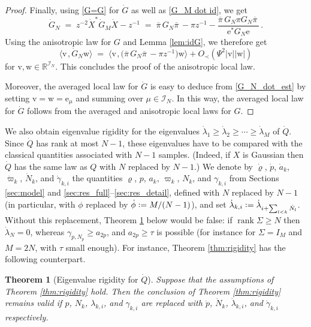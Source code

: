 \documentclass[11pt]{article} %
\newcommand{\nc}{\normalcolor}
\numberwithin{equation}{section}
\numberwithin{figure}{section}
\theoremstyle{plain} %
\newtheorem{theorem}{Theorem}[section]
\theoremstyle{definition} %
\newcommand{\f}[1]{\boldsymbol{\mathrm{#1}}} %
\renewcommand{\cal}{\mathcal}
\newcommand{\ol}[1]{\overline{#1} \!\,} %
\newcommand{\R}{\mathbb{R}}
\newcommand*{\deq}{\mathrel{\vcenter{\baselineskip0.65ex \lineskiplimit0pt \hbox{.}\hbox{.}}}=}
\renewcommand{\geq}{\geqslant}
\newcommand{\pb}[1]{\bigl({#1}\bigr)}
\newcommand{\abs}[1]{\lvert #1 \rvert}
\newcommand{\scalar}[2]{\langle{#1} \mspace{2mu}, {#2}\rangle}
\begin{document}
\begin{proof}
Finally, using \eqref{G=G} for $\dot G$ as well as \eqref{G_M dot id}, we get
\begin{equation*}
\dot G_N \;=\; z^{-2} \dot X^* \dot G_M \dot X - z^{-1} \;=\; \ol \pi G_N \ol \pi - \pi z^{-1} -  \frac{\ol \pi G_N \pi G_N \ol \pi}{\f e^* G_N \f e}\,.
\end{equation*}
 Using the anisotropic law for $G$ and Lemma \ref{lem:idG}, we therefore get \nc
\begin{equation} \label{G_N_dot_est}
\scalar{\f v}{\dot G_N \f w} \;=\; \scalar{\f v}{\pb{\ol \pi G_N \ol \pi - \pi z^{-1}} \f w}  + O_\prec(\Psi^2 \abs{\f v}\abs{\f w})
\end{equation}
for $\f v , \f w \in \R^{\cal I_N}$. This concludes the proof of the anisotropic local law.

Moreover, the averaged local law for $\dot G$ is easy to deduce from \eqref{G_N_dot_est} by setting $\f v = \f w = \f e_\mu$ and summing over $\mu \in \cal I_N$. In this way, the averaged local law for $\dot G$ follows from the averaged and anisotropic local laws for $G$.
\end{proof}

We also obtain eigenvalue rigidity for the eigenvalues $\dot \lambda_1 \geq \dot \lambda_2 \geq \cdots \geq \dot \lambda_M$ of $\dot Q$. Since $\dot Q$ has rank at most $N - 1$, these eigenvalues have to be compared with the classical quantities associated with $N - 1$ samples. (Indeed, if $X$ is Gaussian then $\dot Q$ has the same law as $Q$ with $N$ replaced by $N - 1$.) We denote by $\dot \varrho$, $\dot p$, $\dot a_k$, $\dot \varpi_k$, $\dot N_k$, and $\dot \gamma_{k,i}$ the quantities $\varrho$, $p$, $a_k$, $\varpi_k$, $N_k$, and $\gamma_{k,i}$ from Sections \ref{sec:model} and \ref{sec:res_full}--\ref{sec:res_detail}, defined with $N$ replaced by $N - 1$ (in particular, with $\phi$ replaced by $\dot \phi \deq M / (N - 1)$), and set $\dot \lambda_{k,i} \deq \dot \lambda_{i + \sum_{l < k} \dot N_l}$. Without this replacement, Theorem \ref{thm:rigidity_dot} below would be false: if $\operatorname{rank} \Sigma \geq N$ then $\dot \lambda_N = 0$, whereas $\gamma_{p, N_p} \geq a_{2p}$, and $a_{2p} \geq \tau$ is possible (for instance for $\Sigma = I_M$ and $M = 2N$, with $\tau$ small enough). For instance, Theorem \ref{thm:rigidity} has the following counterpart.

\begin{theorem}[Eigenvalue rigidity for $\dot Q$] \label{thm:rigidity_dot}
Suppose that the assumptions of Theorem \ref{thm:rigidity} hold. Then the conclusion of Theorem \ref{thm:rigidity} remains valid if $p$, $N_k$, $\lambda_{k,i}$, and $\gamma_{k,i}$ are replaced with $\dot p$, $\dot N_k$, $\dot \lambda_{k,i}$, and $\dot \gamma_{k,i}$ respectively.
\end{theorem}
\end{document}
